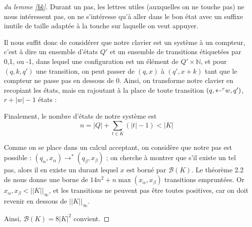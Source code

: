 \documentclass[12pt, a4paper]{article}
\newcommand{\Kinf}{||K||_{\infty}}
\begin{document}
    \begin{proof}[du lemme \ref{bk}]
        
        Durant un pas, les lettres utiles (auxquelles on ne touche pas) ne nous intéressent pas, on ne s'intéresse qu'à aller dans le bon état avec un suffixe inutile de taille adaptée à la touche sur laquelle on veut appuyer.
        
        Il nous suffit donc de considérer que notre clavier est un système à un compteur, c'est à dire un ensemble d'états $Q'$ et un ensemble de transitions étiquetées par 0,1, ou -1, dans lequel une configuration est un élément de $Q' \times \mathbb{N}$, et pour $(q,k,q')$ une transition, on peut passer de $(q,x)$ à $(q',x+k)$ tant que le compteur ne passe pas en dessous de 0.
        Ainsi, on transforme notre clavier en recopiant les états, mais en rajoutant à la place de toute transition $(q,\mathord{\leftarrow}^rw,q')$, $r+|w|-1$ états : 
        
        Finalement, le nombre d'états de notre système est 
        \[n = |Q| + \sum_{t \in K} (|t| - 1) < |K|\] 

        Comme on se place dans un calcul acceptant, on considère que notre pas est possible : $(q_\alpha,x_\alpha) \rightarrow^* (q_\beta,x_\beta)$ ; on cherche à montrer que s'il existe un tel pas, alors il en existe un durant lequel $x$ est borné par $\mathcal{B}(K)$.
        Le théorème 2.2 de \cite{shortpathOCS} nous donne une borne de $14n^2 + n \max (x_\alpha,x_\beta)$ transitions empruntées. Or $x_\alpha,x_\beta < \Kinf$, et les transitions ne peuvent pas être toutes positives, car on doit revenir en dessous de $\Kinf$.
        
        Ainsi, $\mathcal{B}(K) = 8|K|^2$ convient.
       
    \end{proof}
\end{document}
